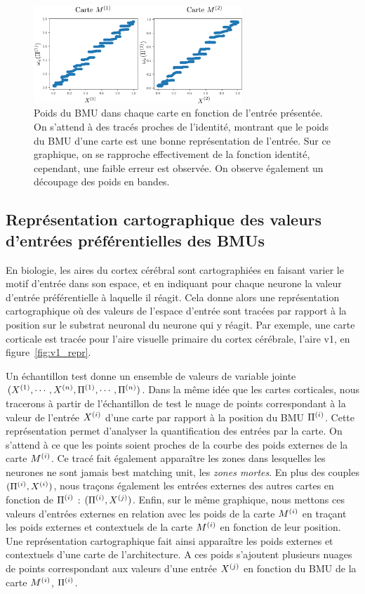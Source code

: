 \documentclass[../main]{subfiles}
\begin{document}
\begin{figure}
    \centering
    \includegraphics[width=0.7\textwidth]{w_x.pdf}
    \caption{Poids du BMU dans chaque carte en fonction de l'entrée présentée. On s'attend à des tracés proches de l'identité, montrant que le poids du BMU d'une carte est une bonne représentation de l'entrée. Sur ce graphique, on se rapproche effectivement de la fonction identité, cependant, une faible erreur est observée. On observe également un découpage des poids en bandes.\label{fig:erreur}}
\end{figure}


\subsection{Représentation cartographique des valeurs d'entrées préférentielles des BMUs}

En biologie, les aires du cortex cérébral sont cartographiées en faisant varier le motif d'entrée dans son espace, et en indiquant pour chaque neurone la valeur d'entrée préférentielle à laquelle il réagit. Cela donne alors une représentation cartographique où des valeurs de l'espace d'entrée sont tracées par rapport à la position sur le substrat neuronal du neurone qui y réagit.
Par exemple, une carte corticale est tracée pour l'aire visuelle primaire du cortex cérébrale, l'aire v1, en figure~\ref{fig:v1_repr}.

Un échantillon test donne un ensemble de valeurs de variable jointe $(X^{({1})}, \cdots, X^{({n})}, \Pi^{({1})},\cdots, \Pi^{({n})})$.
Dans la même idée que les cartes corticales, nous tracerons à partir de l'échantillon de test le nuage de points correspondant à la valeur de l'entrée $X^{({i})}$ d'une carte par rapport à la position du BMU $\Pi^{({i})}$.
Cette représentation permet d'analyser la quantification des entrées par la carte. 
On s'attend à ce que les points soient proches de la courbe des poids externes de la carte $M^{({i})}$.
Ce tracé fait également apparaître les zones dans lesquelles les neurones ne sont jamais best matching unit, les \emph{zones mortes}.
En plus des couples $(\Pi^{({i})},X^{({i})})$, nous traçons également les entrées externes des autres cartes en fonction de $\Pi^{({i})}$ : $(\Pi^{({i})},X^{({j})})$.
Enfin, sur le même graphique, nous mettons ces valeurs d'entrées externes en relation avec les poids de la carte $M^{({i})}$ en traçant les poids externes et contextuels de la carte $M^{({i})}$ en fonction de leur position.
Une représentation cartographique fait ainsi apparaître les poids externes et contextuels d'une carte de l'architecture. A ces poids s'ajoutent plusieurs nuages de points correspondant aux valeurs d'une entrée $X^{({j})}$ en fonction du BMU de la carte $M^{({i})}$, $\Pi^{({i})}$.
\end{document}

